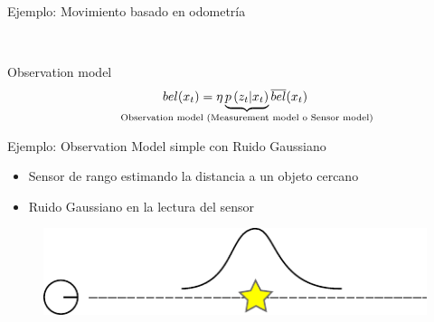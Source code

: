 \begin{frame}{Ejemplo: Movimiento basado en odometría}
    
    \begin{figure}[!h]
        \centering
        \\
    \end{figure}
    
    
\end{frame}

\begin{frame}{Observation model}
    \begin{equation*}
        bel(\state_{t}) = \eta \underbrace{p\left(\observation_{t} |\state_{t} \right)}_{\text{\makebox[0pt]{Observation model (Measurement model o Sensor model)}}} \overline{bel}(\state_{t})
    \end{equation*}
\end{frame}

\begin{frame}{Ejemplo: Observation Model simple con Ruido Gaussiano}
    
    \begin{itemize}
        \item Sensor de rango estimando la distancia a un objeto cercano
        \item Ruido Gaussiano en la lectura del sensor
    \end{itemize}
    
       \begin{figure}[!h]
           \includegraphics[width=0.6\columnwidth]{./images/simple_observation_model.pdf}
    \end{figure}

\end{frame}
